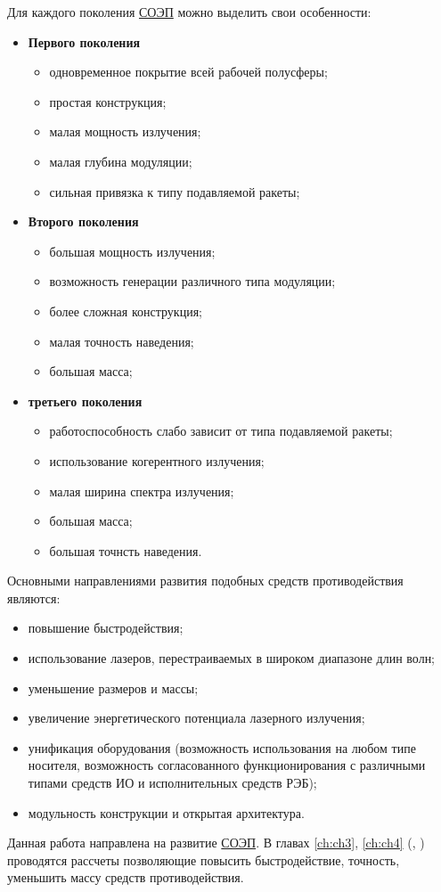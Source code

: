 Для каждого поколения  \hyperref[acroSOEP]{СОЭП} можно выделить свои особенности:
\begin{itemize}
	\item \textbf{Первого поколения}
	\begin{itemize}
		\item одновременное покрытие всей рабочей полусферы;
		\item простая конструкция;
		\item малая мощность излучения;
		\item малая глубина модуляции;
		\item сильная привязка к типу подавляемой ракеты;
	\end{itemize}
	\item \textbf{Второго поколения}
	\begin{itemize}
		\item большая мощность излучения;
		\item возможность генерации различного типа модуляции;
		\item более сложная конструкция;
		\item малая точность наведения;
		\item большая масса;
	\end{itemize}
	\item \textbf{третьего поколения}
	\begin{itemize}
		\item работоспособность слабо зависит от типа подавляемой ракеты;
		\item использование когерентного излучения;
		\item малая ширина спектра излучения;
		\item большая масса;
		\item большая точнсть наведения.
	\end{itemize}
\end{itemize}

Основными направлениями развития подобных средств противодействия являются:
\begin{itemize}
	\item повышение быстродействия;
	\item использование лазеров, перестраиваемых в широком диапазоне длин волн;
	\item уменьшение размеров и массы;
	\item увеличение энергетического потенциала лазерного излучения;
	\item унификация оборудования (возможность использования на любом типе носителя, возможность согласованного функционирования с различными типами средств ИО и исполнительных средств РЭБ);
	\item модульность конструкции и открытая архитектура.
\end{itemize}
Данная работа направлена на развитие  \hyperref[acroSOEP]{СОЭП}. В главах \ref{ch:ch3}, \ref{ch:ch4} (, ) проводятся рассчеты позволяющие повысить быстродействие, точность, уменьшить массу средств противодействия.

